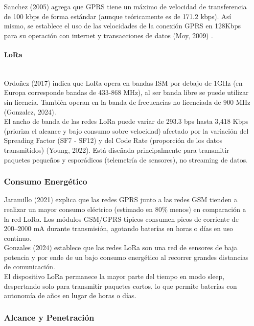 \documentclass[12pt,a4paper]{article}
\begin{document}
	Sanchez (2005) agrega que GPRS tiene un máximo de velocidad  de transferencia de 100 kbps de forma estándar (aunque teóricamente es de 171.2 kbps). Así mismo, se establece el uso de las velocidades de la conexión GPRS en 128Kbps para su operación con internet y transacciones de datos (Moy, 2009) .
	
	\paragraph*{LoRa} \mbox{}\\
	
	Ordoñez (2017) indica que LoRa opera en bandas ISM por debajo de 1GHz (en Europa corresponde bandas de 433-868 MHz), al ser banda libre se puede utilizar sin licencia. También operan en la banda de frecuencias no licenciada de 900 MHz  (Gonzalez, 2024).\\
	
	El ancho de banda de las redes LoRa puede variar de 293.3 bps hasta 3,418 Kbps (prioriza el alcance y bajo consumo sobre velocidad)  afectado por la variación del Spreading Factor (SF7 - SF12) y del Code Rate (proporción de los datos transmitidos) (Young, 2022). Está diseñada principalmente para transmitir paquetes pequeños y esporádicos (telemetría de sensores), no streaming de datos. 
	
	\subsubsection{Consumo Energético}
	
	Jaramillo (2021) explica que las redes GPRS junto a las redes GSM tienden a realizar un mayor consumo eléctrico (estimado en 80\% menos) en comparación a la red LoRa. Los módulos GSM/GPRS típicos consumen picos de corriente de 200–2000 mA durante transmisión, agotando baterías en horas o días en uso continuo. \\
	
	Gonzales (2024) establece que las redes LoRa son una red de sensores de baja potencia y por ende de un bajo consumo energético al recorrer grandes distancias de comunicación.\\

	El dispositivo LoRa permanece la mayor parte del tiempo en modo sleep, despertando solo para transmitir paquetes cortos, lo que permite baterías con autonomía de años en lugar de horas o días. 
	
	\subsubsection{Alcance y Penetración}
	
\end{document}
